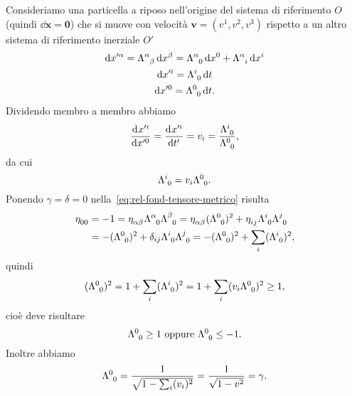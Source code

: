 Consideriamo una particella a riposo nell'origine del sistema di riferimento $O$
(quindi $\dd \bm{x} = \bm{0}$) che si muove con velocità
$\bm{v} = (v^{1},v^{2},v^{3})$ rispetto a un altro sistema di riferimento
inerziale $O'$
\begin{gather}
  \dd x'^{\alpha} = \tensor{\Lambda}{^{\alpha}_{\beta}} \dd x^{\beta} =
  \tensor{\Lambda}{^{\alpha}_{0}} \dd x^{0} + \tensor{\Lambda}{^{\alpha}_{i}}\dd
  x^{i} \\
  \dd x'^{i} = \tensor{\Lambda}{^{i}_{0}}\dd t \\
  \dd x'^{0} = \tensor{\Lambda}{^{0}_{0}}\dd t.
\end{gather}
Dividendo membro a membro abbiamo
\begin{equation}
  \toder{x'^{i}}{x'^{0}} = \toder{x'^{i}}{t'} = v_{i} =
  \frac{\tensor{\Lambda}{^{i}_{0}}}{\tensor{\Lambda}{^{0}_{0}}},
\end{equation}
da cui
\begin{equation}
  \tensor{\Lambda}{^{i}_{0}} = v_{i}\tensor{\Lambda}{^{0}_{0}}.
\end{equation}
Ponendo $\gamma = \delta = 0$ nella~\eqref{eq:rel-fond-tensore-metrico} risulta
\begin{equation}
  \begin{split}
    \tensor{\eta}{_{00}} &= -1 = \tensor{\eta}{_{\alpha\beta}}
    \tensor{\Lambda}{^{\alpha}_{0}} \tensor{\Lambda}{^{\beta}_{0}} =
    \tensor{\eta}{_{\alpha\beta}}(\tensor{\Lambda}{^{0}_{0}})^{2} +
    \tensor{\eta}{_{ij}} \tensor{\Lambda}{^{i}_{0}} \tensor{\Lambda}{^{j}_{0}}
    \\
    &= -(\tensor{\Lambda}{^{0}_{0}})^{2} + \delta_{ij}
    \tensor{\Lambda}{^{i}_{0}} \tensor{\Lambda}{^{j}_{0}} =
    -(\tensor{\Lambda}{^{0}_{0}})^{2} + \sum_{i}(\tensor{\Lambda}{^{i}_{0}})^{2},
  \end{split}
\end{equation}
quindi
\begin{equation}
  (\tensor{\Lambda}{^{0}_{0}})^{2} = 1 +
  \sum_{i}(\tensor{\Lambda}{^{i}_{0}})^{2} = 1 +
  \sum_{i}(v_{i}\tensor{\Lambda}{^{0}_{0}})^{2} \geq 1,
\end{equation}
cioè deve risultare
\begin{equation}
  \tensor{\Lambda}{^{0}_{0}} \geq 1 \text{ oppure } \tensor{\Lambda}{^{0}_{0}}
  \leq -1.
\end{equation}
Inoltre abbiamo
\begin{equation}
  \tensor{\Lambda}{^{0}_{0}} = \frac{1}{\sqrt{1-\sum_{i}(v_{i})^{2}}} =
  \frac{1}{\sqrt{1-v^{2}}} = \gamma.
\end{equation}
